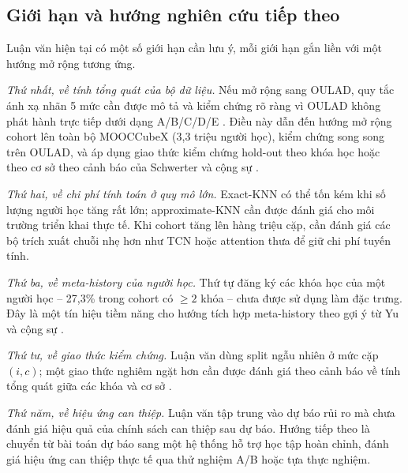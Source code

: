 \subsection{Giới hạn và hướng nghiên cứu tiếp theo}
\label{sec:gioihan}

Luận văn hiện tại có một số giới hạn cần lưu ý, mỗi giới hạn gắn liền với một hướng mở rộng tương ứng.

\textit{Thứ nhất, về tính tổng quát của bộ dữ liệu.} Nếu mở rộng sang OULAD, quy tắc ánh xạ nhãn 5 mức cần được mô tả và kiểm chứng rõ ràng vì OULAD không phát hành trực tiếp dưới dạng A/B/C/D/E \cite{Kuzilek2017}. Điều này dẫn đến hướng mở rộng cohort lên toàn bộ MOOCCubeX (3,3 triệu người học), kiểm chứng song song trên OULAD, và áp dụng giao thức kiểm chứng hold-out theo khóa học hoặc theo cơ sở theo cảnh báo của Schwerter và cộng sự \cite{Schwerter2026}.

\textit{Thứ hai, về chi phí tính toán ở quy mô lớn.} Exact-KNN có thể tốn kém khi số lượng người học tăng rất lớn; approximate-KNN cần được đánh giá cho môi trường triển khai thực tế. Khi cohort tăng lên hàng triệu cặp, cần đánh giá các bộ trích xuất chuỗi nhẹ hơn như TCN hoặc attention thưa để giữ chi phí tuyến tính.

\textit{Thứ ba, về meta-history của người học.} Thứ tự đăng ký các khóa học của một người học -- 27,3\% trong cohort có $\geq 2$ khóa -- chưa được sử dụng làm đặc trưng. Đây là một tín hiệu tiềm năng cho hướng tích hợp meta-history theo gợi ý từ Yu và cộng sự \cite{Yu2022}.

\textit{Thứ tư, về giao thức kiểm chứng.} Luận văn dùng split ngẫu nhiên ở mức cặp $(i, c)$; một giao thức nghiêm ngặt hơn cần được đánh giá theo cảnh báo về tính tổng quát giữa các khóa và cơ sở \cite{Schwerter2026}.

\textit{Thứ năm, về hiệu ứng can thiệp.} Luận văn tập trung vào dự báo rủi ro mà chưa đánh giá hiệu quả của chính sách can thiệp sau dự báo. Hướng tiếp theo là chuyển từ bài toán dự báo sang một hệ thống hỗ trợ học tập hoàn chỉnh, đánh giá hiệu ứng can thiệp thực tế qua thử nghiệm A/B hoặc tựa thực nghiệm.

